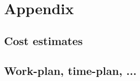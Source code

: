 \section{Appendix}
\label{sec:appx}
\subsection{Cost estimates}
\subsection{Work-plan, time-plan, ...}